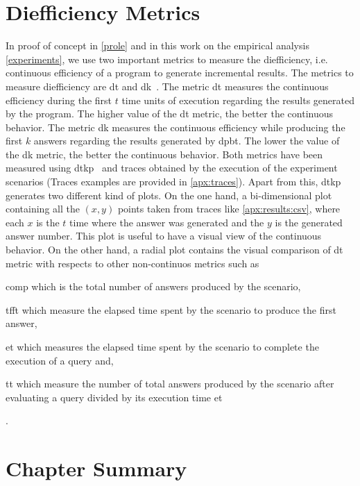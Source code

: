 \section{Diefficiency Metrics}\label{prem:dief}
In proof of concept in \autoref{prole} and in this work on the empirical analysis \autoref{experiments}, we use two important metrics to measure the diefficiency, i.e. continuous efficiency of a program to generate incremental results.
The metrics to measure diefficiency are \acrfull{dt} and \acrfull{dk}~\cite{diefpaper}.
The metric \acrshort{dt} measures the continuous efficiency during the first $t$ time units of execution regarding the results generated by the program. 
The higher value of the \acrshort{dt} metric, the better the continuous behavior.
The metric \acrshort{dk} measures the continuous efficiency while producing the first $k$ answers regarding the results generated by \acrshort{dpbt}. The lower the value of the \acrshort{dk} metric, the better the continuous behavior.
Both metrics have been measured using \acrfull{dtkp}~\cite{diefpy} and traces obtained by the execution of the experiment scenarios (Traces examples are provided in \autoref{apx:traces}).
Apart from this, \acrshort{dtkp} generates two different kind of plots. On the one hand, a bi-dimensional plot containing all the $(x,y)$ points taken from traces like \autoref{apx:results:csv}, where each $x$ is the $t$ time where the answer was generated and the $y$ is the generated answer number.
This plot is useful to have a visual view of the continuous behavior. On the other hand, a radial plot contains the visual comparison of \acrshort{dt} metric with respects to other non-continuos metrics such as 
\begin{inparaenum}[\bf i\upshape)]
  \item \acrfull{comp} which is the total number of answers produced by the scenario, 
  \item \acrfull{tfft} which measure the elapsed time spent by the scenario to produce the first answer, 
  \item \acrfull{et} which measures the elapsed time spent by the scenario to complete the execution of a query and, 
  \item \acrfull{tt} which measure the number of total answers produced by the scenario after evaluating a query divided by its execution time \acrshort{et}
\end{inparaenum}.


\section{Chapter Summary}


